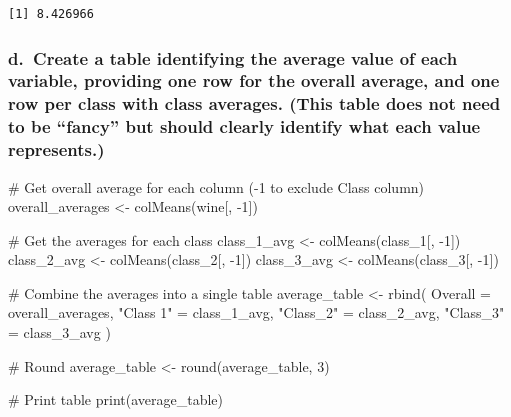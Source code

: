 \documentclass[
  letterpaper,
  DIV=11,
  numbers=noendperiod]{scrartcl}
\newenvironment{Shaded}{\begin{snugshade}}{\end{snugshade}}
\newcommand{\AttributeTok}[1]{\textcolor[rgb]{0.40,0.45,0.13}{#1}}
\newcommand{\CommentTok}[1]{\textcolor[rgb]{0.37,0.37,0.37}{#1}}
\newcommand{\DecValTok}[1]{\textcolor[rgb]{0.68,0.00,0.00}{#1}}
\newcommand{\FunctionTok}[1]{\textcolor[rgb]{0.28,0.35,0.67}{#1}}
\newcommand{\NormalTok}[1]{\textcolor[rgb]{0.00,0.23,0.31}{#1}}
\newcommand{\OtherTok}[1]{\textcolor[rgb]{0.00,0.23,0.31}{#1}}
\newcommand{\SpecialCharTok}[1]{\textcolor[rgb]{0.37,0.37,0.37}{#1}}
\newcommand{\StringTok}[1]{\textcolor[rgb]{0.13,0.47,0.30}{#1}}
\begin{document}
\begin{verbatim}
[1] 8.426966
\end{verbatim}

\subsubsection{d.~Create a table identifying the average value of each
variable, providing one row for the overall average, and one row per
class with class averages. (This table does not need to be ``fancy'' but
should clearly identify what each value
represents.)}\label{d.-create-a-table-identifying-the-average-value-of-each-variable-providing-one-row-for-the-overall-average-and-one-row-per-class-with-class-averages.-this-table-does-not-need-to-be-fancy-but-should-clearly-identify-what-each-value-represents.}

\begin{Shaded}
\begin{Highlighting}[]
\CommentTok{\# Get overall average for each column ({-}1 to exclude Class column)}
\NormalTok{overall\_averages }\OtherTok{\textless{}{-}} \FunctionTok{colMeans}\NormalTok{(wine[, }\SpecialCharTok{{-}}\DecValTok{1}\NormalTok{])}

\CommentTok{\# Get the averages for each class}
\NormalTok{class\_1\_avg }\OtherTok{\textless{}{-}} \FunctionTok{colMeans}\NormalTok{(class\_1[, }\SpecialCharTok{{-}}\DecValTok{1}\NormalTok{])}
\NormalTok{class\_2\_avg }\OtherTok{\textless{}{-}} \FunctionTok{colMeans}\NormalTok{(class\_2[, }\SpecialCharTok{{-}}\DecValTok{1}\NormalTok{])}
\NormalTok{class\_3\_avg }\OtherTok{\textless{}{-}} \FunctionTok{colMeans}\NormalTok{(class\_3[, }\SpecialCharTok{{-}}\DecValTok{1}\NormalTok{])}

\CommentTok{\# Combine the averages into a single table}
\NormalTok{average\_table }\OtherTok{\textless{}{-}} \FunctionTok{rbind}\NormalTok{(}
  \AttributeTok{Overall =}\NormalTok{ overall\_averages,}
  \StringTok{"Class 1"} \OtherTok{=}\NormalTok{ class\_1\_avg,}
  \StringTok{"Class\_2"} \OtherTok{=}\NormalTok{ class\_2\_avg,}
  \StringTok{"Class\_3"} \OtherTok{=}\NormalTok{ class\_3\_avg}
\NormalTok{)}

\CommentTok{\# Round}
\NormalTok{average\_table }\OtherTok{\textless{}{-}} \FunctionTok{round}\NormalTok{(average\_table, }\DecValTok{3}\NormalTok{)}

\CommentTok{\# Print table}
\FunctionTok{print}\NormalTok{(average\_table)}
\end{Highlighting}
\end{Shaded}
\end{document}
